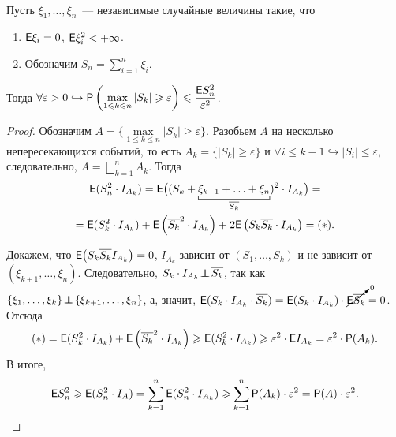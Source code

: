\begin{theorem}~

	Пусть $\xi_1,  \ldots, \xi_n$~--- независимые случайные величины такие, что
	\begin{enumerate}
	    \item $\mathsf{E} \xi_i = 0$, $\mathsf{E} \xi_i^2 < +\infty$.
	    \item Обозначим $S_n = \sum\limits_{i = 1}^n \xi_i$.
	\end{enumerate}  
	
	Тогда $\forall \varepsilon > 0 \hookrightarrow \mathsf{P} \left( \max\limits_{1 \leqslant k \leqslant n} |S_k| \geqslant \varepsilon \right) \leqslant \dfrac{\mathsf{E} S_n^2}{\varepsilon^2}$.
	\begin{proof}
		Обозначим $A = \{ \max\limits_{1 \leqslant k \leqslant n} |S_k| \geqslant \varepsilon \}$. Разобьем $A$ на несколько непересекающихся событий, то есть $A_k = \big\{ |S_k| \geqslant \varepsilon\big\}$ и $\forall i \leqslant k - 1 \hookrightarrow |S_i| \leqslant \varepsilon$, следовательно, $A = \bigsqcup\limits_{k=1}^{n} A_k$. Тогда
		\begin{multline*}
			\E(S_n^2 \cdot I_{A_k}) = \E\big( (S_k + \underbracket[0.5pt]{\xi_{k+1} + \ldots + \xi_n}_{\overline{S_k}} )^2 \cdot I_{A_k} \big) =  \\= \E( S_k^2 \cdot I_{A_k} ) + \E\left( \overline{S_k}^2 \cdot I_{A_k} \right) + 2 \E\left( S_k \overline{S_k} \cdot I_{A_k} \right) = (*).
		\end{multline*}
		
		Докажем, что $\mathsf{E} \big(S_k\overline{S_k}I_{A_k} \big) = 0$, $I_{A_k}$ зависит от $(S_1, \dots, S_k)$ и не зависит от $(\xi_{k+1}, \dots, \xi_n)$.
		Следовательно, $S_k \cdot I_{A_k} \!\perp\!\!\!\!\perp\! \overline{S_k}$, так как $\{\xi_1, \ldots, \xi_k \} \!\perp\!\!\!\!\perp\! \{ \xi_{k+1}, \ldots,\xi_n \}$, а, значит, $\mathsf{E}( S_k \cdot I_{A_k} \cdot \overline{S_k} ) = \mathsf{E}(S_k \cdot I_{A_k}) \cdot \cancelto{0}{\mathsf{E} \overline{S_k}} = 0$. Отсюда
		\begin{equation*}
			(*) = \mathsf{E}( S_k^2 \cdot I_{A_k} ) + \mathsf{E} \left( \overline{S_k}^2 \cdot I_{A_k}  \right) \geqslant \mathsf{E}(S_k^2 \cdot I_{A_k} ) \geqslant \varepsilon^2 \cdot \mathsf{E} I_{A_k} = \varepsilon^2 \cdot \mathsf{P}(A_k).
		\end{equation*}
		В итоге, 
		\begin{equation*}
			\mathsf{E} S_n^2 \geqslant \mathsf{E}( S_n^2 \cdot I_A ) = \sum\limits_{k = 1}^n \mathsf{E}( S_n^2 \cdot I_{A_k} ) \geqslant \sum\limits_{k = 1}^n \mathsf{P}(A_k) \cdot \varepsilon^2 = \mathsf{P}(A) \cdot \varepsilon^2.
		\end{equation*}
	\end{proof}
\end{theorem}

